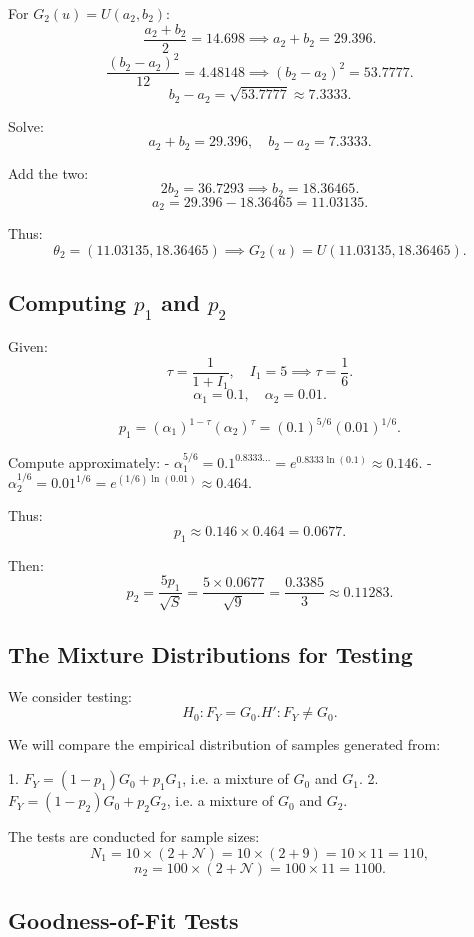\documentclass{article}
\begin{document}
For \(G_2(u) = U(a_2,b_2)\):
\[
\frac{a_2 + b_2}{2} = 14.698 \implies a_2 + b_2 = 29.396.
\]
\[
\frac{(b_2 - a_2)^2}{12} = 4.48148 \implies (b_2 - a_2)^2 = 53.7777.
\]
\[
b_2 - a_2 = \sqrt{53.7777} \approx 7.3333.
\]

Solve:
\[
a_2 + b_2 = 29.396, \quad b_2 - a_2 = 7.3333.
\]

Add the two:
\[
2b_2 = 36.7293 \implies b_2 = 18.36465.
\]
\[
a_2 = 29.396 - 18.36465 = 11.03135.
\]

Thus:
\[
\theta_2 = (11.03135, 18.36465) \implies G_2(u) = U(11.03135,18.36465).
\]

\subsection{Computing \( p_1 \) and \( p_2 \)}

Given:
\[
\tau = \frac{1}{1+I_1}, \quad I_1 = 5 \implies \tau = \frac{1}{6}.
\]
\[
\alpha_1 = 0.1, \quad \alpha_2 = 0.01.
\]

\[
p_1 = (\alpha_1)^{1-\tau} (\alpha_2)^\tau = (0.1)^{5/6} (0.01)^{1/6}.
\]

Compute approximately:
- \(\alpha_1^{5/6} = 0.1^{0.8333...} = e^{0.8333 \ln(0.1)} \approx 0.146.\)
- \(\alpha_2^{1/6} = 0.01^{1/6} = e^{(1/6)\ln(0.01)} \approx 0.464.\)

Thus:
\[
p_1 \approx 0.146 \times 0.464 = 0.0677.
\]

Then:
\[
p_2 = \frac{5 p_1}{\sqrt{S}} = \frac{5 \times 0.0677}{\sqrt{9}} = \frac{0.3385}{3} \approx 0.11283.
\]

\subsection{The Mixture Distributions for Testing}

We consider testing:
\[
H_0: F_Y = G_0.
H': F_Y \neq G_0.
\]

We will compare the empirical distribution of samples generated from:

1. \(F_Y = (1-p_1)G_0 + p_1 G_1\), i.e. a mixture of \(G_0\) and \(G_1\).
2. \(F_Y = (1-p_2)G_0 + p_2 G_2\), i.e. a mixture of \(G_0\) and \(G_2\).

The tests are conducted for sample sizes:
\[
N_1 = 10 \times (2+\mathcal{N}) = 10 \times (2+9) = 10 \times 11 = 110,
\]
\[
n_2 = 100 \times (2+\mathcal{N}) = 100 \times 11 = 1100.
\]

\subsection{Goodness-of-Fit Tests}
\end{document}
